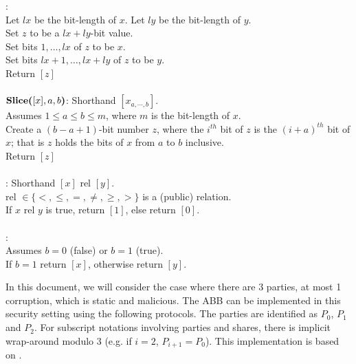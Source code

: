 \begin{functionality}
	\Concat{[x]}{[y]}: \\
		\indent Let $lx$ be the bit-length of $x$.
			Let $ly$ be the bit-length of $y$.\\
		\indent Set $z$ to be a $lx + ly$-bit value.\\
		\indent Set bits $1, \ldots, lx$ of $z$ to be $x$.\\
		\indent Set bits $lx+1, \ldots, lx+ly$ of $z$ to be $y$.\\
		\indent Return $[z]$\\ \\
	$\textbf{Slice(}[x], a, b\textbf{)}$: Shorthand $[x_{a, \cdots, b}]$. \\
		\indent Assumes $1 \leq a \leq b \leq m$, where $m$ is the bit-length
		of $x$.\\
		\indent Create a $(b-a+1)$-bit number $z$,
			where the $i^{th}$ bit of $z$ is the $(i+a)^{th}$ bit of $x$;
			that is $z$ holds the bits of $x$ from $a$ to $b$ inclusive.\\
		\indent Return $[z]$\\ \\
	: Shorthand $[x]$ rel $[y]$.\\
		\indent rel $\in \{<, \leq, =, \neq, \geq, >\}$ is a (public) relation.\\
		\indent If $x$ rel $y$ is true, return $[1]$, else return $[0]$. \\ \\
	\IfThen{[b]}{[x]}{[y]}: \\
		\indent Assumes $b=0$ (false) or $b=1$ (true). \\
		\indent If $b = 1$ return $[x]$, otherwise return $[y]$. \\
\end{functionality}

In this document, we will consider the case where there are 3 parties,
at most 1 corruption, which is static and malicious.
The ABB can be implemented in this security setting using the following protocols.
The parties are identified as $P_0$, $P_1$ and $P_2$.
For subscript notations involving parties and shares,
there is implicit wrap-around modulo 3
(e.g. if $i=2$, $P_{i+1} = P_0$).
This implementation is based on \cite{EC:FLNW17}.

